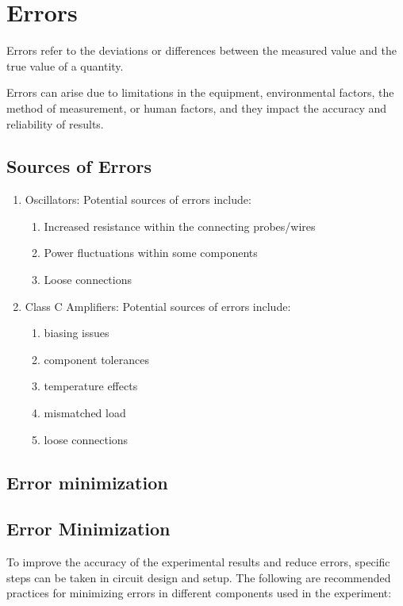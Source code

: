\documentclass[12pt,a4paper]{article}
\begin{document}
    \section{Errors}

    Errors refer to the deviations or differences between the measured value and the true value of a quantity.

    Errors can arise due to limitations in the equipment, environmental factors, the method of measurement, or human factors, and they impact the accuracy and reliability of results. 
    \subsection{Sources of Errors}
    \begin{enumerate}
        \item Oscillators: Potential sources of errors include:
        \begin{enumerate}
            \item Increased resistance within the connecting probes/wires
            \item Power fluctuations within some components
            \item Loose connections
        \end{enumerate}
        \item Class C Amplifiers: Potential sources of errors include:
        \begin{enumerate}
            \item biasing issues
            \item component tolerances
            \item temperature effects
            \item mismatched load
            \item loose connections
        \end{enumerate}
    \end{enumerate}
    \subsection{Error minimization}
    \subsection{Error Minimization}

    To improve the accuracy of the experimental results and reduce errors, specific steps can be taken in circuit design and setup. The following are recommended practices for minimizing errors in different components used in the experiment:
\end{document}

